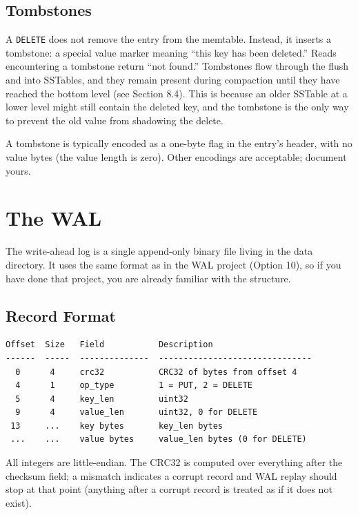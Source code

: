 \documentclass[11pt,a4paper]{article}
\begin{document}
\subsection{Tombstones}
A \texttt{DELETE} does not remove the entry from the memtable. Instead, it inserts a tombstone: a special value marker meaning ``this key has been deleted.'' Reads encountering a tombstone return ``not found.'' Tombstones flow through the flush and into SSTables, and they remain present during compaction until they have reached the bottom level (see Section 8.4). This is because an older SSTable at a lower level might still contain the deleted key, and the tombstone is the only way to prevent the old value from shadowing the delete.

A tombstone is typically encoded as a one-byte flag in the entry's header, with no value bytes (the value length is zero). Other encodings are acceptable; document yours.

\section{The WAL}

The write-ahead log is a single append-only binary file living in the data directory. It uses the same format as in the WAL project (Option 10), so if you have done that project, you are already familiar with the structure.

\subsection{Record Format}

\begin{codebox}
\begin{lstlisting}
Offset  Size   Field           Description
------  -----  --------------  -------------------------------
  0      4     crc32           CRC32 of bytes from offset 4
  4      1     op_type         1 = PUT, 2 = DELETE
  5      4     key_len         uint32
  9      4     value_len       uint32, 0 for DELETE
 13     ...    key bytes       key_len bytes
 ...    ...    value bytes     value_len bytes (0 for DELETE)
\end{lstlisting}
\end{codebox}

All integers are little-endian. The CRC32 is computed over everything after the checksum field; a mismatch indicates a corrupt record and WAL replay should stop at that point (anything after a corrupt record is treated as if it does not exist).
\end{document}
